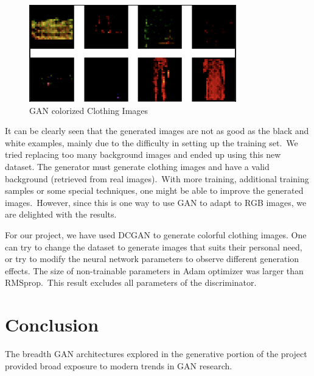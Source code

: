 \documentclass[conference]{IEEEtran}
\begin{document}
    \begin{figure}
        \caption{GAN colorized Clothing Images}
        \label{fig:colorized_result}
        \includegraphics[width=9cm]{learned_result.png}
        \centering
    \end{figure}

     It can be clearly seen that the generated images are not as good as the black and white examples, mainly due to the difficulty in setting up the training set.\ We tried replacing too many background images and ended up using this new dataset. The generator must generate clothing images and have a valid background (retrieved from real images).\ With more training, additional training samples or some special techniques, one might be able to improve the generated images.\ However, since this is one way to use GAN to adapt to RGB images, we are delighted with the results.
    
    For our project, we have used DCGAN to generate colorful clothing images. One can try to change the dataset to generate images that suits their personal need, or try to modify the neural network parameters to observe different generation effects. The size of non-trainable parameters in Adam optimizer was larger than RMSprop.\ This result excludes all parameters of the discriminator.\ 

    \section{Conclusion}\label{sec:conclusion}

    The breadth GAN architectures explored in the generative portion of the project provided broad exposure to modern trends in GAN research.

    
    
\end{document}
